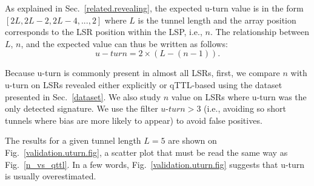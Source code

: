 As explained in Sec.~\ref{related.revealing},  the expected u-turn value is in
the form $[2L, 2L-2, 2L-4,..., 2]$ where $L$ is the tunnel length and the array
position corresponds to the LSR position within the LSP, i.e., $n$.  The
relationship between $L$, $n$, and the expected value can thus be written as
follows:
\begin{equation}
u-turn = 2 \times (L - (n-1)) .
\label{eqn.uturn}
\end{equation}


Because u-turn is commonly present in almost all LSRs, first, we compare $n$
with u-turn on LSRs revealed either explicitly or qTTL-based using the dataset
presented in Sec.~\ref{dataset}.  We also study  $n$ value on LSRs where u-turn
was the only detected signature. We use the filter $\textit{u-turn}>3$ (i.e.,
avoiding so short tunnels where bias are more likely to appear) to avoid false
positives.

The results for a given tunnel length $L=5$ are shown on
Fig.~\ref{validation.uturn.fig}, a scatter plot that must be read the same way
as Fig.~\ref{n_vs_qttl}.  In a few words, Fig.~\ref{validation.uturn.fig}
suggests that u-turn is usually overestimated.  


